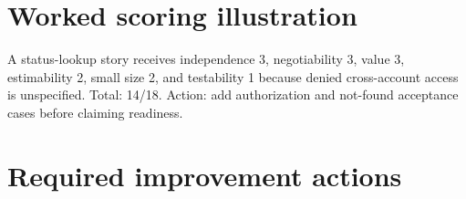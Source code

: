 \documentclass[11pt,letterpaper]{article}
\begin{document}
\section{Worked scoring illustration}
\begin{tcolorbox}[colback=tealback,colframe=navy,title={Original example},breakable]
A status-lookup story receives independence 3, negotiability 3, value 3, estimability 2, small size 2, and testability 1 because denied cross-account access is unspecified. Total: 14/18. Action: add authorization and not-found acceptance cases before claiming readiness.

\end{tcolorbox}
\section{Required improvement actions}
\end{document}
